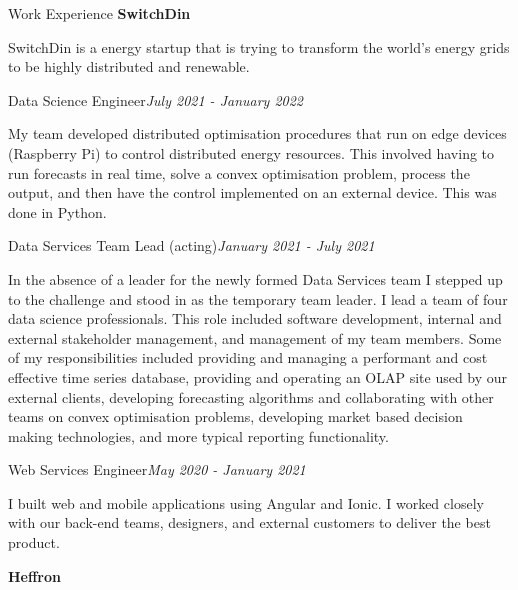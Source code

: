 \documentclass{resume} %
\begin{document}
\begin{rSection}{Work Experience}
    {\bf SwitchDin}

    SwitchDin is a energy startup that is trying to transform the world's energy grids to be highly
    distributed and renewable.

    \begin{adjustwidth}{2em}{}
        \begin{rSubsection}{Data Science Engineer}{\em July 2021 - January 2022}{}{}
            \item My team developed distributed optimisation procedures that run on edge devices (Raspberry Pi) to control
            distributed energy resources. This involved having to run forecasts in real time, solve a convex optimisation problem, process the output, and
            then have the control implemented on an external device. This was done in Python.
        \end{rSubsection}

        \begin{rSubsection}{Data Services Team Lead (acting)}{\em January 2021 - July 2021}{}{}
            \item In the absence of a leader for the newly formed Data Services team I stepped up to the
            challenge and stood in as the temporary team leader. I lead a team of four data science
            professionals. This role included software development, internal and external stakeholder
            management, and management of my team members. Some of my responsibilities included providing
            and managing a performant and cost effective time series database, providing and operating an
            OLAP site used by our external clients, developing forecasting algorithms and collaborating
            with other teams on convex optimisation problems, developing market based decision making
            technologies, and more typical reporting functionality.
        \end{rSubsection}

        \begin{rSubsection}{Web Services Engineer}{\em May 2020 - January 2021}{}{}
            \item I built web and mobile applications using Angular and Ionic.
            I worked closely with our back-end teams, designers, and external customers
            to deliver the best product.
        \end{rSubsection}
    \end{adjustwidth}

    {\bf Heffron}


\end{rSection}
\end{document}
